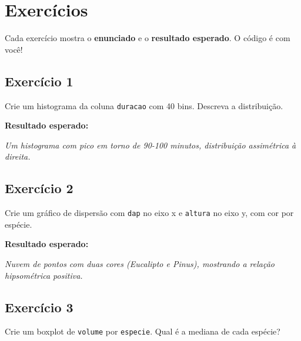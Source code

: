 \documentclass[
  letterpaper,
]{scrbook}
\begin{document}
\section{Exercícios}\label{exercuxedcios-2}

\begin{tcolorbox}[enhanced jigsaw, arc=.35mm, bottomrule=.15mm, bottomtitle=1mm, breakable, colback=white, colbacktitle=quarto-callout-note-color!10!white, colframe=quarto-callout-note-color-frame, coltitle=black, left=2mm, leftrule=.75mm, opacityback=0, opacitybacktitle=0.6, rightrule=.15mm, title=\textcolor{quarto-callout-note-color}{\faInfo}\hspace{0.5em}{Como fazer os exercícios}, titlerule=0mm, toprule=.15mm, toptitle=1mm]

Cada exercício mostra o \textbf{enunciado} e o \textbf{resultado
esperado}. O código é com você!

\end{tcolorbox}

\subsection{Exercício 1}\label{exercuxedcio-1-2}

Crie um histograma da coluna \texttt{duracao} com 40 bins. Descreva a
distribuição.

\textbf{Resultado esperado:}

\emph{Um histograma com pico em torno de 90-100 minutos, distribuição
assimétrica à direita.}

\subsection{Exercício 2}\label{exercuxedcio-2-2}

Crie um gráfico de dispersão com \texttt{dap} no eixo x e
\texttt{altura} no eixo y, com cor por espécie.

\textbf{Resultado esperado:}

\emph{Nuvem de pontos com duas cores (Eucalipto e Pinus), mostrando a
relação hipsométrica positiva.}

\subsection{Exercício 3}\label{exercuxedcio-3-2}

Crie um boxplot de \texttt{volume} por \texttt{especie}. Qual é a
mediana de cada espécie?
\end{document}
